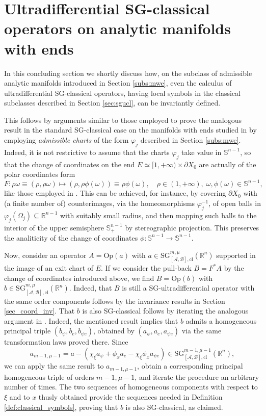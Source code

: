 \documentclass[11pt,reqno]{amsart}
\numberwithin{equation}{section}
\newcommand{\R}{{\mathbb{R}}} %
\newcommand{\Op}{{\mathrm{Op}}}
\newcommand{\SG}{{\mathrm{SG}}}
\newcommand{\A}{{\mathcal{A}}} %
\newcommand{\B}{{\mathcal{B}}} %
\begin{document}
\section{Ultradifferential SG-classical operators on analytic manifolds with ends}\label{sec:SGABmwe}
%
In this concluding section we shortly discuss how, on the subclass of admissible analytic manifolds introduced in Section \ref{subs:mwe},
even the calculus of ultradifferential SG-classical operators, having local symbols in the classical subclasses described in Section \ref{sec:sgucl}, 
can be invariantly defined.  

This follows by arguments similar to those employed to prove the analogous result in the standard SG-classical case on the manifolds
with ends studied in \cite{MP2002} by employing \textit{admissible charts} of the form $\varphi_j$ described in Section \ref{subs:mwe}.
Indeed, it is not restrictive to assume that the charts $\varphi_j$ take value in $\mathbb{S}^{n-1}$,
so that the change of coordinates on the end $E\simeq[1,+\infty)\times\partial X_0$ are actually of the polar coordinates form 
%
\[
	F\colon\rho\omega\equiv(\rho,\rho\omega)\mapsto(\rho,\rho\phi(\omega))\equiv\rho\phi(\omega), \quad\rho\in(1,+\infty), \; \omega,\phi(\omega)\in\mathbb{S}^{n-1},
\]
%
like those employed in \cite{MP2002}. This can be achieved, for instance, by covering $\partial X_0$ with (a finite number of) counterimages, via the
homeomorphisms $\varphi_j^{-1}$, of open balls in $\varphi_j(\Omega_j)\subseteq\mathbb{R}^{n-1}$ with suitably small radius, and then mapping such balls 
to the interior of the upper semisphere $\mathbb{S}^{n-1}_+$ by stereographic projection. This preserves the analiticity of the change of coordinates 
$\phi\colon\mathbb{S}^{n-1}\to\mathbb{S}^{n-1}$.

Now, consider an operator $A=\Op(a)$ with $a\in{\SG}_{[\A,\B],\mathrm{cl}}^{m,\mu}(\R^n)$ supported in the image of an exit chart of $E$. If we consider
the pull-back $B=F^*A$ by the change of coordinates introduced above, we find $B=\Op(b)$ with $b\in{\SG}_{[\A,\B],\mathrm{cl}}^{m,\mu}(\R^n)$.
Indeed, that $B$ is still a SG-ultradifferential operator with the same order components follows by the invariance results in Section \ref{sec_coord_inv}.
That $b$ is also SG-classical follows by iterating the analogous argument in \cite{MP2002}. Indeed, the mentioned result implies that $b$ admits
a homogeneous principal triple $(b_\psi, b_e, b_{\psi e})$, obtained by $(a_\psi, a_e, a_{\psi e})$ via the same transformation laws proved there.
Since 
%
\[
	a_{m-1,\mu-1}=a-(\chi_\xi a_\psi+\phi_x a_e - \chi_\xi\phi_x a_{\psi e}) \in {\SG}_{[\A,\B],\mathrm{cl}}^{m-1,\mu-1}(\R^n),
\]
%
we can apply the same result to $a_{m-1,\mu-1}$, obtain a corresponding principal homogeneous triple of orders $m-1,\mu-1$, 
and iterate the procedure an arbitrary number of times. 
The two sequences of homogeneous components with respect to $\xi$ and to $x$ thusly obtained provide the sequences needed in Definition 
\ref{def:classical_symbols}, proving that $b$ is also SG-classical, as claimed.
\end{document}
